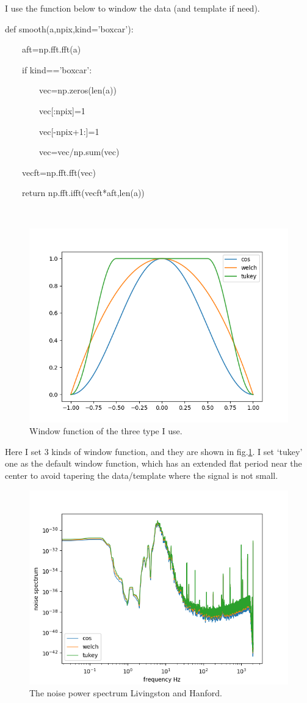 \documentclass[showpacs, oneside, onecolumn, prl, amsmath, amssymb, nofootinbib, superscriptaddress, notitlepage]{revtex4-1}
\newcommand\bfig{\begin{figure}}
\newcommand\efig{\end{figure}}
\begin{document}
I use the function below to window the data (and template if need).

{\color{gray}
def smooth(a,npix,kind='boxcar'):

~~~~aft=np.fft.fft(a)

~~~~if kind=='boxcar':

~~~~~~~~vec=np.zeros(len(a))

~~~~~~~~vec[:npix]=1

~~~~~~~~vec[-npix+1:]=1

~~~~~~~~vec=vec/np.sum(vec)

~~~~vecft=np.fft.fft(vec)

~~~~return np.fft.ifft(vecft*aft,len(a))

~~~~
}

\bfig
	\centering
	\includegraphics[scale=0.85]{5-1window.png}
	\caption{Window function of the three type I use.}
	\label{window}
\efig

Here I set 3 kinds of window function, and they are shown in fig.\ref{window}. I set `tukey' one as the default window function, which has an extended flat period near the center to avoid tapering the data/template where the signal is not small.


\bfig
	\centering
	\includegraphics[scale=0.85]{5-1PS_H.png}
	\caption{The noise power spectrum Livingston and Hanford.}
	\label{PSh}
\efig
\end{document}
